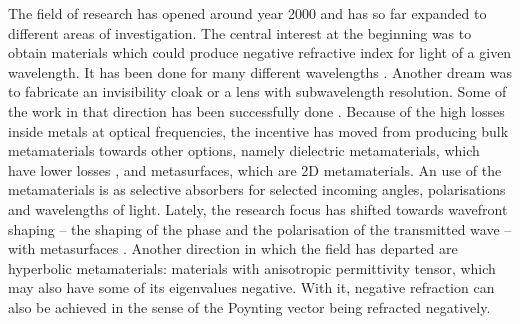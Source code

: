 \documentclass[a4paper,11pt]{article}
\begin{document}
The field of research has opened around year 2000 \cite{koak} and has so far expanded to different areas of investigation. 
The central interest at the beginning was to obtain materials which could produce negative refractive index for light of a given wavelength. 
It has been done for many different wavelengths \cite{pwqo}. 
Another dream was to fabricate an invisibility cloak or a lens with subwavelength resolution. 
Some of the work in that direction has been successfully done \cite{lal, ei}. 
Because of the high losses inside metals at optical frequencies, the incentive has moved from producing bulk metamaterials towards other options, namely dielectric metamaterials, which have lower losses \cite{}, and metasurfaces, which are 2D metamaterials. 
An use of the metamaterials is as selective absorbers for selected incoming angles, polarisations and wavelengths of light. 
Lately, the research focus has shifted towards wavefront shaping -- the shaping of the phase and the polarisation of the transmitted wave -- with metasurfaces \cite{}.  
Another direction in which the field has departed are hyperbolic metamaterials: materials with anisotropic permittivity tensor, which may also have some of its eigenvalues negative. 
With it, negative refraction can also be achieved in the sense of the Poynting vector being refracted negatively.


\end{document}
